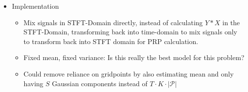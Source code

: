 \begin{itemize}
    \item Implementation
    \begin{itemize}
        \item Mix signals in STFT-Domain directly, instead of calculating $Y*X$ in the STFT-Domain, transforming back into time-domain to mix signals only to transform back into STFT domain for PRP calculation.
        \item Fixed mean, fixed variance: Is this really the best model for this problem?
        \item Could remove reliance on gridpoints by also estimating mean and only having $S$ Gaussian components instead of $T\cdot K\cdot |\mathcal{P}|$
    \end{itemize}
\end{itemize}
